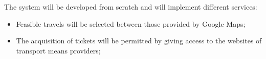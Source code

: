The system will be developed from scratch and will implement different services:
\begin{itemize}
\item Feasible travels will be selected between those provided by Google Maps;
\item The acquisition of tickets will be permitted by giving access to the websites of transport means providers;
\end{itemize}